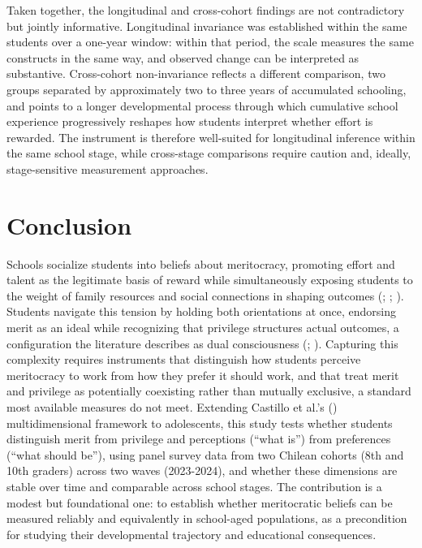 \documentclass[
  13pt,
]{article}
\begin{document}
Taken together, the longitudinal and cross-cohort findings are not
contradictory but jointly informative. Longitudinal invariance was
established within the same students over a one-year window: within that
period, the scale measures the same constructs in the same way, and
observed change can be interpreted as substantive. Cross-cohort
non-invariance reflects a different comparison, two groups separated by
approximately two to three years of accumulated schooling, and points to
a longer developmental process through which cumulative school
experience progressively reshapes how students interpret whether effort
is rewarded. The instrument is therefore well-suited for longitudinal
inference within the same school stage, while cross-stage comparisons
require caution and, ideally, stage-sensitive measurement approaches.

\section{Conclusion}\label{conclusion}

Schools socialize students into beliefs about meritocracy, promoting
effort and talent as the legitimate basis of reward while simultaneously
exposing students to the weight of family resources and social
connections in shaping outcomes
(;
;
). Students
navigate this tension by holding both orientations at once, endorsing
merit as an ideal while recognizing that privilege structures actual
outcomes, a configuration the literature describes as dual consciousness
(;
). Capturing
this complexity requires instruments that distinguish how students
perceive meritocracy to work from how they prefer it should work, and
that treat merit and privilege as potentially coexisting rather than
mutually exclusive, a standard most available measures do not meet.
Extending Castillo et al.'s
() multidimensional
framework to adolescents, this study tests whether students distinguish
merit from privilege and perceptions (``what is'') from preferences
(``what should be''), using panel survey data from two Chilean cohorts
(8th and 10th graders) across two waves (2023-2024), and whether these
dimensions are stable over time and comparable across school stages. The
contribution is a modest but foundational one: to establish whether
meritocratic beliefs can be measured reliably and equivalently in
school-aged populations, as a precondition for studying their
developmental trajectory and educational consequences.
\end{document}
